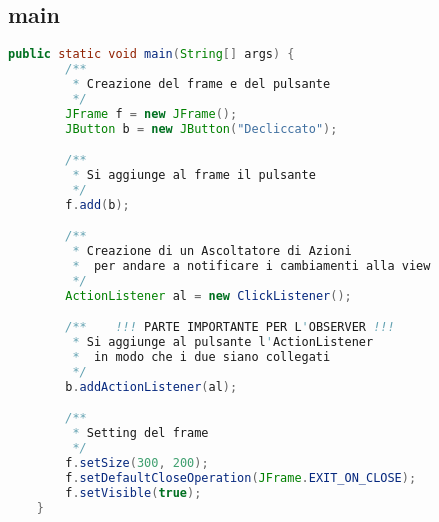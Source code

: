 \subsection{main}
\begin{lstlisting}[language=java]
    public static void main(String[] args) {
        /** 
         * Creazione del frame e del pulsante
         */  
        JFrame f = new JFrame();
        JButton b = new JButton("Decliccato");

        /** 
         * Si aggiunge al frame il pulsante
         */ 
        f.add(b);

        /** 
         * Creazione di un Ascoltatore di Azioni
         *  per andare a notificare i cambiamenti alla view
         */
        ActionListener al = new ClickListener();

        /**    !!! PARTE IMPORTANTE PER L'OBSERVER !!!
         * Si aggiunge al pulsante l'ActionListener
         *  in modo che i due siano collegati
         */
        b.addActionListener(al);

        /**
         * Setting del frame
         */
        f.setSize(300, 200);
        f.setDefaultCloseOperation(JFrame.EXIT_ON_CLOSE);
        f.setVisible(true);
    }
\end{lstlisting}